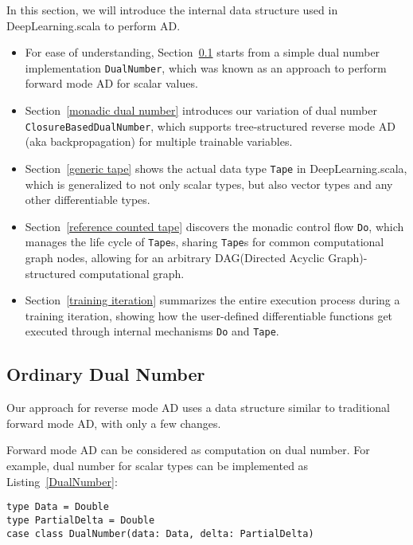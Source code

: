 In this section, we will introduce the internal data structure used in DeepLearning.scala to perform AD.

\begin{itemize}

  \item For ease of understanding, Section~\ref{dual number} starts from a simple dual number implementation \lstinline{DualNumber}, which was known as an approach to perform forward mode AD for scalar values.
  
  \item Section~\ref{monadic dual number} introduces our variation of dual number \lstinline{ClosureBasedDualNumber}, which supports tree-structured reverse mode AD (aka backpropagation) for multiple \glspl{trainable variable}.

  \item Section~\ref{generic tape} shows the actual data type \lstinline{Tape} in DeepLearning.scala, which is generalized to not only scalar types, but also vector types and any other differentiable types.

  \item Section~\ref{reference counted tape} discovers the monadic control flow \lstinline{Do}, which manages the life cycle of \lstinline{Tape}s, sharing \lstinline{Tape}s for common \gls{computational graph} nodes, allowing for an arbitrary DAG(Directed Acyclic Graph)-structured \gls{computational graph}.

  \item Section~\ref{training iteration} summarizes the entire execution process during a training iteration, showing how the user-defined \glspl{differentiable function} get executed through internal mechanisms \lstinline{Do} and \lstinline{Tape}.

\end{itemize}

\subsection{Ordinary Dual Number}
\label{dual number}

Our approach for reverse mode AD uses a data structure similar to traditional forward mode AD, with only a few changes.

Forward mode AD can be considered as computation on dual number. For example, dual number for scalar types can be implemented as Listing~\ref{DualNumber}:

\begin{lstlisting}[float={h t b p},caption={Dual number for forward mode AD}, label={DualNumber}]
type Data = Double
type PartialDelta = Double
case class DualNumber(data: Data, delta: PartialDelta)
\end{lstlisting}

